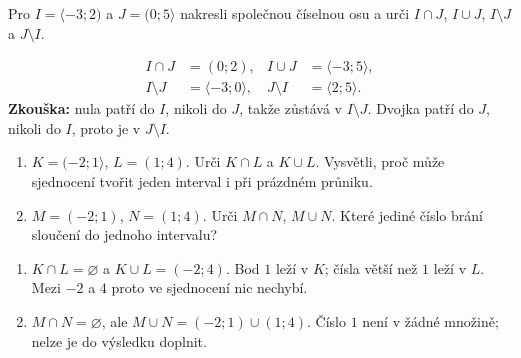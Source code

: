 \documentclass[11pt,a4paper]{article}
\begin{document}
\begin{prikladReseniBox}[title={Příklad 1}]
Pro $I=\langle-3;2)$ a $J=(0;5\rangle$ nakresli společnou
číselnou osu a urči $I\cap J$, $I\cup J$, $I\setminus J$ a $J\setminus I$.
\tcblower
\begin{center}
\end{center}
\[
\begin{aligned}
I\cap J&=(0;2),& I\cup J&=\langle-3;5\rangle,\\
I\setminus J&=\langle-3;0\rangle,&J\setminus I&=\langle2;5\rangle.
\end{aligned}
\]
\textbf{Zkouška:} nula patří do $I$, nikoli do $J$, takže zůstává v $I\setminus J$.
Dvojka patří do $J$, nikoli do $I$, proto je v $J\setminus I$.
\end{prikladReseniBox}

\begin{zadaniReseniBox}[title={Samostatná práce 4}]
\begin{enumerate}[label=\alph*),start=2]
\item $K=(-2;1\rangle$, $L=(1;4)$. Urči $K\cap L$ a $K\cup L$.
Vysvětli, proč může sjednocení tvořit jeden interval i při prázdném průniku.
\item $M=(-2;1)$, $N=(1;4)$. Urči $M\cap N$, $M\cup N$.
Které jediné číslo brání sloučení do jednoho intervalu?
\end{enumerate}
\tcblower
\begin{enumerate}[label=\alph*),start=2]
\item $K\cap L=\varnothing$ a $K\cup L=(-2;4)$.
Bod $1$ leží v $K$; čísla větší než $1$ leží v $L$.
Mezi $-2$ a $4$ proto ve sjednocení nic nechybí.
\item $M\cap N=\varnothing$, ale $M\cup N=(-2;1)\cup(1;4)$.
Číslo $1$ není v žádné množině; nelze je do výsledku doplnit.
\end{enumerate}
\end{zadaniReseniBox}
\end{document}
